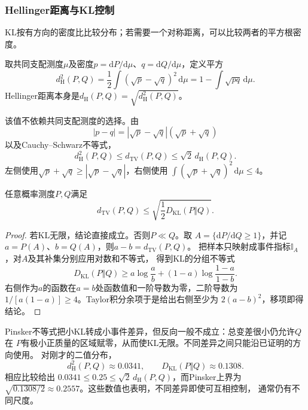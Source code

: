\subsubsection{Hellinger距离与KL控制}
KL按有方向的密度比比较分布；若需要一个对称距离，可以比较两者的平方根密度。
\begin{definition}[Hellinger距离]
  \label{def:information-hellinger-distance}
取共同支配测度\(\mu\)及密度\(p=\mathrm dP/\mathrm d\mu\)、\(q=\mathrm dQ/\mathrm d\mu\)，定义平方
\begin{equation}
  d_{\mathrm{H}}^2(P,Q)
  =
  \frac12\int(\sqrt{p}-\sqrt{q})^2\,\mathrm{d}\mu
  =
  1-\int\sqrt{pq}\,\mathrm{d}\mu.
  \label{eq:information-hellinger}
\end{equation}
Hellinger距离本身是\(d_{\mathrm H}(P,Q)=\sqrt{d_{\mathrm H}^2(P,Q)}\)。
\end{definition}
该值不依赖共同支配测度的选择。由
\[
  |p-q|
  =
  |\sqrt p-\sqrt q|(\sqrt p+\sqrt q)
\]
以及Cauchy--Schwarz不等式，
\[
  d_{\mathrm{H}}^2(P,Q)
  \leq
  d_{\mathrm{TV}}(P,Q)
  \leq
  \sqrt{2}\,d_{\mathrm{H}}(P,Q).
\]
左侧使用\(\sqrt p+\sqrt q\geq|\sqrt p-\sqrt q|\)，右侧使用
\(\int(\sqrt p+\sqrt q)^2\,\mathrm{d}\mu\leq4\)。
\begin{theorem}[Pinsker不等式]
\label{thm:information-pinsker}
任意概率测度\(P,Q\)满足
\begin{equation}
  d_{\mathrm{TV}}(P,Q)
  \leq
  \sqrt{\frac12D_{\mathrm{KL}}(P\Vert Q)}.
  \label{eq:information-pinsker}
\end{equation}
\end{theorem}
\begin{proof}
若KL无限，结论直接成立。否则\(P\ll Q\)。取
\(A=\{\mathrm{d}P/\mathrm{d}Q\geq1\}\)，并记
\(a=P(A)\)、\(b=Q(A)\)，则\(a-b=d_{\mathrm{TV}}(P,Q)\)。
把样本只映射成事件指标\(\mathbb{I}_A\)，对\(A\)及其补集分别应用对数和不等式，
得到KL的分组不等式
\[
  D_{\mathrm{KL}}(P\Vert Q)
  \geq
  a\log\frac{a}{b}
  +(1-a)\log\frac{1-a}{1-b}.
\]
右侧作为\(a\)的函数在\(a=b\)处函数值和一阶导数为零，二阶导数为
\(1/[a(1-a)]\geq4\)。Taylor积分余项于是给出右侧至少为
\(2(a-b)^2\)，移项即得结论。
\end{proof}
Pinsker不等式把小KL转成小事件差异，但反向一般不成立：总变差很小仍允许\(Q\)在
\(P\)有极小正质量的区域赋零，从而使KL无限。不同差异之间只能沿已证明的方向使用。
对刚才的二值分布，
\[
  d_{\mathrm{H}}^2(P,Q)\approx0.0341,\qquad
  D_{\mathrm{KL}}(P\Vert Q)\approx0.1308.
\]
相应比较给出
\(0.0341\leq0.25\leq\sqrt2\,d_{\mathrm{H}}(P,Q)\)，而Pinsker上界为
\(\sqrt{0.1308/2}\approx0.2557\)。这些数值也表明，不同差异即使可互相控制，
通常仍有不同尺度。
